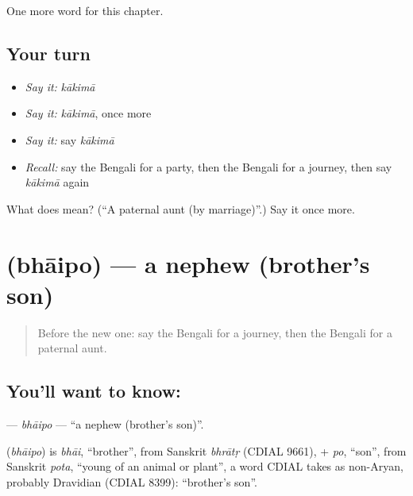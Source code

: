 \begin{grammarlens}[title={What you've built}]
One more word for this chapter.
\end{grammarlens}

\subsection*{Your turn}
\begin{itemize}
\raggedright
  \item \emph{Say it:} \emph{kākimā}
  \item \emph{Say it:} \emph{kākimā}, once more
  \item \emph{Say it:} say \emph{kākimā}
  \item \emph{Recall:} say the Bengali for a party, then the Bengali for a journey, then say \emph{kākimā} again
\end{itemize}

\begin{tcolorbox}[breakable,colback=teal!4,colframe=teal!35!black,title={Before you move on}]
What does  mean? (\textquotedblleft{}A paternal aunt (by marriage)\textquotedblright{}.) Say it once more.
\end{tcolorbox}
\section[\texorpdfstring{\bn{ভাইপো} (bhāipo)}{ভাইপো (bhāipo)}]{ (bhāipo) — a nephew (brother's son)}

\label{lesson:BN-C252-bhaipo}



\begin{quote}
Before the new one: say the Bengali for a journey, then the Bengali for a paternal aunt.
\end{quote}

\subsection*{You'll want to know: }
\textbf{} — \emph{bhāipo} — \textquotedblleft{}a nephew (brother's son)\textquotedblright{}.

\begin{cousinweb}
\textbf{} (\emph{bhāipo}) is \emph{bhāi}, \textquotedblleft{}brother\textquotedblright{}, from Sanskrit \emph{bhrātṛ} (CDIAL 9661), + \emph{po}, \textquotedblleft{}son\textquotedblright{}, from Sanskrit \emph{pota}, \textquotedblleft{}young of an animal or plant\textquotedblright{}, a word CDIAL takes as non-Aryan, probably Dravidian (CDIAL 8399): \textquotedblleft{}brother's son\textquotedblright{}.
\end{cousinweb}

